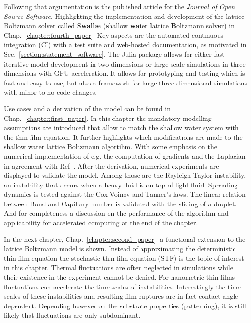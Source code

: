 Following that argumentation is the published article for the \textit{Journal of Open Source Software}. 
Highlighting the implementation and development of the lattice Boltzmann solver called \textbf{Swalbe} (\textbf{s}hallow \textbf{wa}ter \textbf{l}attice \textbf{B}oltzmann solv\textbf{e}r) in Chap.~\ref{chapter:fourth_paper}.
Key aspects are the automated continuous integration (CI) with a test suite and web-hosted documentation, as motivated in Sec.~\ref{section:statement_software}.
The Julia package allows for either fast iterative model development in two dimensions or large scale simulations in three dimensions with GPU acceleration.
It allows for prototyping and testing which is fast and easy to use, but also a framework for large three dimensional simulations with minor to no code changes.

Use cases and a derivation of the model can be found in Chap.~\ref{chapter:first_paper}.
In this chapter the mandatory modelling assumptions are introduced that allow to match the shallow water system with the thin film equation.
It further highlights which modifications are made to the shallow water lattice Boltzmann algortihm. 
With some emphasis on the numerical implementation of e.g. the computation of gradients and the Laplacian in agreement with Ref~\cite{junkDiscretizationsIncompressibleNavier2000, thampiIsotropicDiscreteLaplacian2013}. 
After the derivation, numerical experiments are displayed to validate the model. 
Among those are the Rayleigh-Taylor instability, an instability that occurs when a heavy fluid is on top of light fluid. 
Spreading dynamics is tested against the Cox-Voinov and Tanner's laws. 
The linear relation between Bond and Capillary number is validated with the sliding of a droplet.
And for completeness a discussion on the performance of the algorithm and applicability for accelerated computing at the end of the chapter.

In the next chapter, Chap.~\ref{chapter:second_paper}, a functional extension to the lattice Boltzmann model is shown.
Instead of approximating the deterministic thin film equation the stochastic thin film equation (STF) is the topic of interest in this chapter.
Thermal fluctuations are often neglected in simulations while their existence in the experiment cannot be denied.
For nanometric thin films fluctuations can accelerate the time scales of instabilities. 
Interestingly the time scales of these instabilities and resulting film ruptures are in fact contact angle dependent.
Depending however on the substrate properties (patterning), it is still likely that fluctuations are only subdominant.

